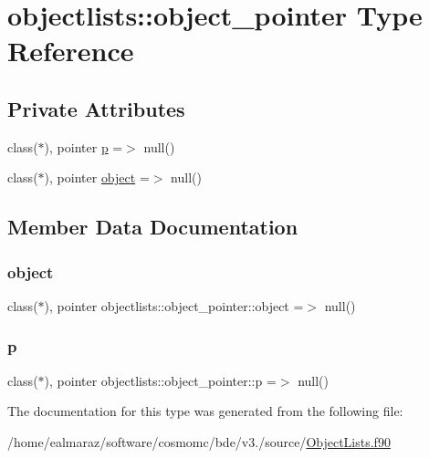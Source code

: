 \hypertarget{structobjectlists_1_1object__pointer}{}\section{objectlists\+:\+:object\+\_\+pointer Type Reference}
\label{structobjectlists_1_1object__pointer}
\subsection*{Private Attributes}
\begin{DoxyCompactItemize}
\item 
class($\ast$), pointer \mbox{\hyperlink{structobjectlists_1_1object__pointer_ae615a26b0481c54c61577083c6da1680}{p}} =$>$ null()
\item 
class($\ast$), pointer \mbox{\hyperlink{structobjectlists_1_1object__pointer_a41b0df235c9090f7bb39aff9ed7427f4}{object}} =$>$ null()
\end{DoxyCompactItemize}


\subsection{Member Data Documentation}
\mbox{\label{structobjectlists_1_1object__pointer_a41b0df235c9090f7bb39aff9ed7427f4}} 
\subsubsection{\texorpdfstring{object}{object}}
{\footnotesize\ttfamily class($\ast$), pointer objectlists\+::object\+\_\+pointer\+::object =$>$ null()\hspace{0.3cm}{\ttfamily [private]}}

\mbox{\label{structobjectlists_1_1object__pointer_ae615a26b0481c54c61577083c6da1680}} 
\subsubsection{\texorpdfstring{p}{p}}
{\footnotesize\ttfamily class($\ast$), pointer objectlists\+::object\+\_\+pointer\+::p =$>$ null()\hspace{0.3cm}{\ttfamily [private]}}



The documentation for this type was generated from the following file\+:\begin{DoxyCompactItemize}
\item 
/home/ealmaraz/software/cosmomc/bde/v3./source/\mbox{\hyperlink{ObjectLists_8f90}{Object\+Lists.\+f90}}\end{DoxyCompactItemize}
